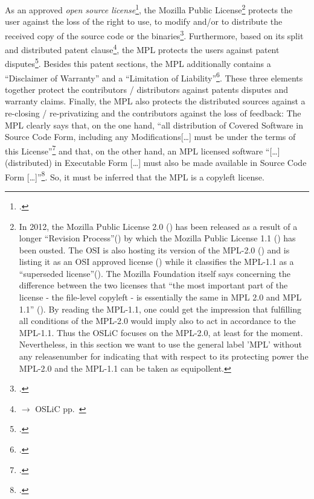 As an approved \emph{open source license}\footcite[cf.][\nopage wp]{OSI2012b},
the Mozilla Public License\footnote{In 2012, the Mozilla Public License 2.0
(\cite[cf.][\nopage wp]{Mpl20MozFoundation2012a}) has been released as a result
of a longer \enquote{Revision Process}(\cite[cf.][\nopage
wp]{Mpl11To20MozFoundation2013a}) by which the  Mozilla Public License 1.1
(\cite[cf.][\nopage wp]{Mpl11MozFoundation2013a}) has been ousted. The OSI is
also hosting its version of the MPL-2.0 (\cite[cf.][\nopage
wp]{Mpl20OsiLicense2013a}) and is listing it as an OSI approved license
(\cite[cf.][\nopage wp]{OSI2012b}) while it classifies the MPL-1.1 as a
\enquote{superseded license}(\cite[cf.][\nopage wp]{OSI2013b}). The Mozilla
Foundation itself says concerning the difference between the two licenses that
\enquote{the most important part of the license - the file-level copyleft - is
essentially the same in MPL 2.0 and MPL 1.1} (\cite[cf.][\nopage
wp]{Mpl11To20MozFoundation2013a}). By reading the MPL-1.1, one could get the
impression that fulfilling all conditions of the MPL-2.0 would imply also to act
in accordance to the MPL-1.1. Thus the OSLiC focuses on the MPL-2.0, at least
for the moment. Nevertheless, in this section we want to use the general label
'MPL' without any releasenumber for indicating that with respect to its
protecting power the MPL-2.0 and the MPL-1.1 can be taken as equipollent.}
protects the user against the loss of the right to use, to modify and/or to
distribute the received copy of the source code or the
binaries\footcite[cf.][\nopage wp\ §2.1.a]{Mpl20OsiLicense2013a}.
Furthermore, based on its split and distributed patent
clause\footnote{$\rightarrow$ OSLiC pp.\ \pageref{subsec:MplPatentClause}}, the
MPL protects the users against patent disputes\footcite[cf.][\nopage wp\
§2.1.b, §2.3, §5.2]{Mpl20OsiLicense2013a}. Besides this patent sections, the MPL
additionally contains a \enquote{Disclaimer of Warranty} and a
\enquote{Limitation of Liability}\footcite[cf.][\nopage wp\ §6 \&
§7]{Mpl20OsiLicense2013a}. These three elements together protect the
contributors / distributors against patents disputes and warranty claims.
Finally, the MPL also protects the distributed sources against a re-closing /
re-privatizing and the contributors against the loss of feedback: The MPL
clearly says that, on the one hand, \enquote{all distribution of Covered
Software in Source Code Form, including any Modifications[\ldots] must be under
the terms of this License}\footcite[cf.][\nopage wp\
§3.1]{Mpl20OsiLicense2013a} and that, on the other hand, an MPL licensed
software \enquote{[\ldots] (distributed) in Executable Form [\ldots] must also
be made available in Source Code Form [\ldots]}\footcite[cf.][\nopage wp\
§3.2]{Mpl20OsiLicense2013a}. So, it must be inferred that the MPL is a copyleft
license.

